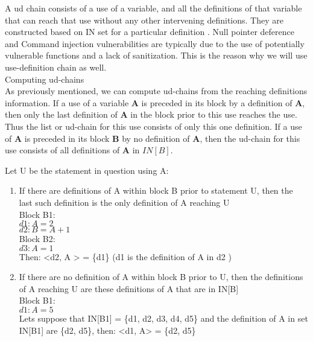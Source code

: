 A \gls{ud} chain consists of a use of a variable, and all the definitions of that variable that can reach that use without any other intervening definitions. They are constructed based on IN set for a particular definition \cite{Kronjee2018}. Null pointer deference and Command injection vulnerabilities are typically due to the use of potentially vulnerable functions and a lack of sanitization. This is the reason why we will use use-definition chain as well.\\




{\Large Computing ud-chains} \\

As previously mentioned, we can  compute  ud-chains  from  the reaching definitions  information. If  a use  of a variable \textbf{A} is preceded in its block  by  a definition  of \textbf{A}, then  only  the last  definition of \textbf{A}  in the block  prior to this use  reaches  the use. Thus the list or ud-chain for this use  consists of only this one definition. If a use of \textbf{A} is preceded  in its block \textbf{B} by no definition of \textbf{A}, then the ud-chain for this use consists of all definitions of \textbf{A} in \(IN[B]\).

Let U be the statement in question using A:

\begin{enumerate}
\item If there are definitions of A within block B prior to statement U, then the last such definition is the only definition of A reaching U\\

Block B1:\\
\(d1: A = 2\)\\ 
\(d2: B = A + 1\)\\

Block B2:\\
\(d3: A = 1\)\\

Then: <d2, A > = \{d1\} (d1 is the definition of A in d2 )

\item If there are no definition of A within block B prior to U, then the definitions of A reaching U are these definitions of A that are in IN[B]\\

Block B1:\\
\(d1: A = 5\)\\ 

Lets suppose that IN[B1] = \{d1, d2, d3, d4, d5\} and the definition of A in set IN[B1] are \{d2, d5\}, then:
<d1, A> = \{d2, d5\}

\end{enumerate}

